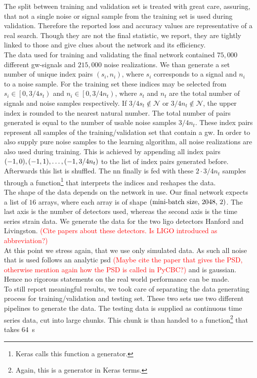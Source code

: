 The split between training and validation set is treated with great care, assuring, that not a single noise or signal sample from the training set is used during validation. Therefore the reported loss and accuracy values are representative of a real search. Though they are not the final statistic, we report, they are tightly linked to those and give clues about the network and its efficiency.\\
The data used for training and validating the final network contained $75,000$ different \gls{gw}-signals and $215,000$ noise realizations. We than generate a set number of unique index pairs $(s_i, n_i)$, where $s_i$ corresponds to a signal and $n_i$ to a noise sample. For the training set these indices may be selected from $s_i\in\left[0, 3/4s_t\right)$ and $n_i\in\left[0, 3/4n_t\right)$, where $s_t$ and $n_t$ are the total number of signals and noise samples respectively. If $3/4s_t\notin\mathcal{N}$ or $3/4n_t\notin\mathcal{N}$, the upper index is rounded to the nearest natural number. The total number of pairs generated is equal to the number of usable noise samples $3/4 n_t$. These index pairs represent all samples of the training/validation set that contain a \gls{gw}. In order to also supply pure noise samples to the learning algorithm, all noise realizations are also used during training. This is achieved by appending all index pairs ${\left( -1, 0 \right)}, {\left( -1, 1 \right)}, \dotsc, {\left( -1, 3/4n_t \right)}$ to the list of index pairs generated before. Afterwards this list is shuffled. The \gls{nn} finally is fed with these $2\cdot 3/4 n_t$ samples through a function\footnote{Keras calls this function a generator.} that interprets the indices and reshapes the data.\\
The shape of the data depends on the network in use. Our final network expects a list of $16$ arrays, where each array is of shape ${\left( \text{mini-batch size, 2048, 2} \right)}$. The last axis is the number of detectors used, whereas the second axis is the time series strain data. We generate the data for the two \gls{ligo} detectors Hanford and Livingston. \textcolor{red}{(Cite papers about these detectors. Is LIGO introduced as abbreviation?)}\\
At this point we stress again, that we use only simulated data. As such all noise that is used follows an analytic \gls{psd} \textcolor{red}{(Maybe cite the paper that gives the PSD, otherwise mention again how the PSD is called in PyCBC?)} and is gaussian. Hence no rigorous statements on the real world performance can be made.\medskip\\
To still report meaningful results, we took care of separating the data generating process for training/validation and testing set. These two sets use two different pipelines to generate the data. The testing data is supplied as continuous time series data, cut into large chunks. This chunk is than handed to a function\footnote{Again, this is a generator in Keras terms.} that takes \SI{64}{\s}

